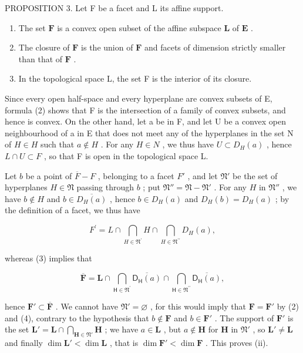 PROPOSITION 3. Let F be a facet and L its affine support.

\begin{enumerate}
\def\labelenumi{(\roman{enumi})}
\item
  The set \(\mathbf{F}\) is a convex open subset of the affine subspace \(\mathbf{L}\) of \(\mathbf{E}\) .
\item
  The closure of \(\mathbf{F}\) is the union of \(\mathbf{F}\) and facets of dimension strictly smaller than that of \(\mathbf{F}\) .
\item
  In the topological space L, the set F is the interior of its closure.
\end{enumerate}

Since every open half-space and every hyperplane are convex subsets of E, formula (2) shows that F is the intersection of a family of convex subsets, and hence is convex. On the other hand, let a be in F, and let U be a convex open neighbourhood of a in E that does not meet any of the hyperplanes in the set N of \(H \in H\) such that \(a \notin H\) . For any \(H \in N\) , we thus have \(U \subset D_{H}(a)\) , hence \(L \cap U \subset F\) , so that F is open in the topological space L.

Let \(b\) be a point of \(\overline{F} - F\) , belonging to a facet \(F'\) , and let \(\mathfrak{N}'\) be the set of hyperplanes \(H \in \mathfrak{N}\) passing through \(b\) ; put \(\mathfrak{N}'' = \mathfrak{N} - \mathfrak{N}'\) . For any \(H\) in \(\mathfrak{N}''\) , we have \(b \notin H\) and \(b \in \overline{D_H(a)}\) , hence \(b \in D_H(a)\) and \(D_H(b) = D_H(a)\) ; by the definition of a facet, we thus have

\[
F ^ {\prime} = L \cap \bigcap_ {H \in \mathfrak {N} ^ {\prime}} H \cap \bigcap_ {H \in \mathfrak {N} ^ {\prime \prime}} D _ {H} (a),\tag{4}
\]

whereas (3) implies that

\[
\overline {{\mathbf {F}}} = \mathbf {L} \cap \bigcap_ {\mathsf {H} \in \mathfrak {N} ^ {\prime}} \overline {{\mathsf {D} _ {\mathsf {H}} (a)}} \cap \bigcap_ {\mathsf {H} \in \mathfrak {N} ^ {\prime \prime}} \overline {{\mathsf {D} _ {\mathsf {H}} (a)}},\tag{5}
\]

hence \(\mathbf{F}' \subset \overline{\mathbf{F}}\) . We cannot have \(\mathfrak{N}' = \varnothing\) , for this would imply that \(\mathbf{F} = \mathbf{F}'\) by (2) and (4), contrary to the hypothesis that \(b \notin \mathbf{F}\) and \(b \in \mathbf{F}'\) . The support of \(\mathbf{F}'\) is the set \(\mathbf{L}' = \mathbf{L} \cap \bigcap_{\mathbf{H} \in \mathfrak{N}'} \mathbf{H}\) ; we have \(a \in \mathbf{L}\) , but \(a \notin \mathbf{H}\) for \(\mathbf{H}\) in \(\mathfrak{N}'\) , so \(\mathbf{L}' \neq \mathbf{L}\) and finally \(\dim \mathbf{L}' < \dim \mathbf{L}\) , that is \(\dim \mathbf{F}' < \dim \mathbf{F}\) . This proves (ii).

